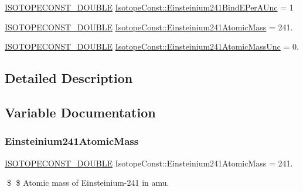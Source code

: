 \begin{DoxyCompactItemize}
\mbox{\hyperlink{group___isotope_const-_macros_ga8f45a7272ce02c0b4c65c44636ed719a}{I\+S\+O\+T\+O\+P\+E\+C\+O\+N\+S\+T\+\_\+\+D\+O\+U\+B\+LE}} \mbox{\hyperlink{group___isotope_const-_einsteinium-_es241_ga74fc582352db732ead8631717f1d8358}{Isotope\+Const\+::\+Einsteinium241\+Bind\+E\+Per\+A\+Unc}} = 1
\item 
\mbox{\hyperlink{group___isotope_const-_macros_ga8f45a7272ce02c0b4c65c44636ed719a}{I\+S\+O\+T\+O\+P\+E\+C\+O\+N\+S\+T\+\_\+\+D\+O\+U\+B\+LE}} \mbox{\hyperlink{group___isotope_const-_einsteinium-_es241_ga72eb517c3fbf04e4716900a4a529716f}{Isotope\+Const\+::\+Einsteinium241\+Atomic\+Mass}} = 241.
\item 
\mbox{\hyperlink{group___isotope_const-_macros_ga8f45a7272ce02c0b4c65c44636ed719a}{I\+S\+O\+T\+O\+P\+E\+C\+O\+N\+S\+T\+\_\+\+D\+O\+U\+B\+LE}} \mbox{\hyperlink{group___isotope_const-_einsteinium-_es241_ga036f20511f4da132eb9852672cf1fce9}{Isotope\+Const\+::\+Einsteinium241\+Atomic\+Mass\+Unc}} = 0.
\end{DoxyCompactItemize}


\subsection{Detailed Description}


\subsection{Variable Documentation}
\mbox{\label{group___isotope_const-_einsteinium-_es241_ga72eb517c3fbf04e4716900a4a529716f}} 
\subsubsection{\texorpdfstring{Einsteinium241\+Atomic\+Mass}{Einsteinium241AtomicMass}}
{\footnotesize\ttfamily \mbox{\hyperlink{group___isotope_const-_macros_ga8f45a7272ce02c0b4c65c44636ed719a}{I\+S\+O\+T\+O\+P\+E\+C\+O\+N\+S\+T\+\_\+\+D\+O\+U\+B\+LE}} Isotope\+Const\+::\+Einsteinium241\+Atomic\+Mass = 241.}

\$ \$ Atomic mass of Einsteinium-\/241 in amu. \mbox{\label{group___isotope_const-_einsteinium-_es241_ga036f20511f4da132eb9852672cf1fce9}} 
